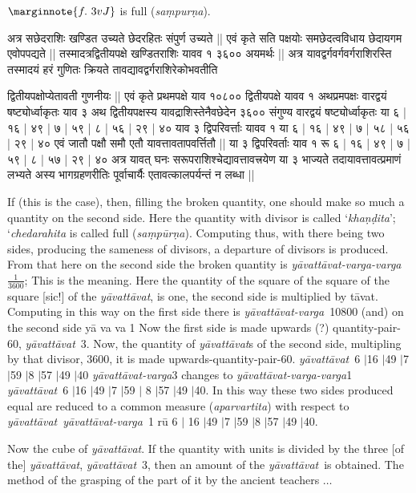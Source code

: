 \documentclass[12pt]{book}
\def\ya{\textit{y\=avat\-t\=avat}}
\def\yava{\textit{y\=avat\-t\=avat-varga}}
\def\yavava{\textit{y\=avat\-t\=avat-varga-varga}}
\def\elp{$\ldots$}
\def\danda{$|$}
\begin{document}
$\marginnote{f.~3v J}$
is full (\textit{sa\d mpur\d na}).  

\newpage

{\s अत्र सछेदराशिः खण्डित
उच्यते छेदरहितः संपुर्ण उच्यते || एवं कृते सति पक्षयोः समछेदत्वविधाय छेदायगम
एवोपपद्यते || तस्मादत्रद्वितीयपक्षे खण्डितराशिः यावव १ ३६०० अयमर्थः || अत्र
यावद्वर्गवर्गवर्गराशिरस्ति तस्मादयं हरं गुणितः क्रियते तावद्यावद्वर्गराशिरेकोभवतीति 

द्वितीयपक्षोप्येतावती गुणनीयः || एवं कृते प्रथमपक्षे याव १०८०० द्वितीयपक्षे यावव १ अथप्रमपक्षः
वारद्वयं षष्ट्योर्ध्वाकृतः याव ३ अथ द्वितीयपक्षस्य यावद्राशिस्तेनैवछेदेन ३६०० संगुण्य
वारद्वयं षष्ट्योर्ध्वाकृतः या ६ | १६ | ४९ | ७ | ५९ | ८ | ५६ | २९ | ४० याव ३ द्विपरिवर्त्ताः यावव १ या ६ | १६ | ४९ | ७ |
५८ | ५६ | २९ | ४० एवं जातौ पक्षौ समौ एतौ यावत्तावतापवर्त्तितौ || या ३ द्विपरिवर्ताः याव १ रू ६ | १६ | ४९ | ७ |
५९ | ८ | ५७ | २९ | ४० अत्र यावत् घनः सरूपराशिश्चेद्यावत्तावत्त्रयेण या ३ भाज्यते तदायावत्तावत्प्रमाणं
लभ्यते अस्य भागग्रहणरीतिः पूर्वाचार्यैः एतावत्कालपर्यन्तं न लब्धा ||}

\newpage

If (this is the case), then, filling the broken quantity, one should make so much a quantity 
on the second side.  Here the quantity with divisor is called `\textit{kha\d n\d dita}'; 
`\textit{chedarahita} is called full (\textit{sa\d mp\=ur\d na}).  Computing thus, with there 
being two sides,  producing the sameness of divisors, a departure of divisors is produced.  
From that here on the second side the broken quantity is \yavava\  $\frac{1}{3600}$; 
This is the meaning.  Here the quantity of the square of the square of the square [sic!] 
of the \ya, is one, the second side is multiplied by t\=avat.  Computing in this way on 
the first side there is \yava\ 10800 (and) on the second side y\=a va va 1 Now the 
first side is made upwards (?) quantity-pair-60, \ya\ 3.  Now, the quantity of \ya s 
of the second side, multipling by that divisor, 3600, it is made upwards-quantity-pair-60. 
\ya\ 6 \danda 16 \danda 49 \danda 7 \danda 59 \danda 8 \danda 57 \danda 49 \danda 40 
\yava 3 changes to \yavava 1 \ya\ 6 \danda 16 \danda 49 \danda 7 \danda 59 \danda 
8 \danda 57 \danda 49 \danda 40.  In this way these two sides  produced equal are reduced 
to a common measure (\textit{aparvartita}) with respect to \ya\ \yava\ 1 r\=u 6 \danda 
16 \danda 49 \danda 7 \danda 59 \danda 8 \danda 57 \danda 49 \danda 40.

Now the cube of \ya.  If the quantity with units is divided by the three [of the] \ya,
\ya\ 3, 
then an amount of the \ya\ is obtained.    
The method of the grasping of the part of it 
by the ancient teachers \elp 
\end{document}
